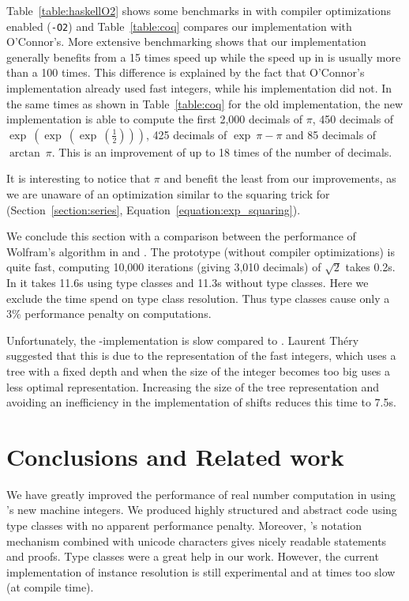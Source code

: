 \documentclass[a4paper,10pt,runningheads]{llncs}
\begin{document}
Table~\ref{table:haskellO2} shows some benchmarks in \Haskell{} with compiler optimizations enabled (\texttt{-O2}) and Table~\ref{table:coq} compares our \Coq{} implementation with O'Connor's. More extensive benchmarking shows that our \Haskell{} implementation generally benefits from a 15 times speed up while the speed up in \Coq{} is usually more than a 100 times. This difference is explained by the fact that O'Connor's \Haskell{} implementation already used fast integers, while his \Coq{} implementation did not. In the same times as shown in Table~\ref{table:coq} for the old implementation, the new implementation is able to compute the first 2,000 decimals of $\pi$, 450 decimals of $\exp\ (\exp\ (\exp\ (\frac 1 2 ))) $, 425 decimals of $\exp\ \pi - \pi$ and 85 decimals of $\arctan\ \pi$. This is an improvement of up to 18 times of the number of decimals.

It is interesting to notice that $\pi$ and \arctan{} benefit the least from our improvements, as we are unaware of an optimization similar to the squaring trick for \exp{} (Section~\ref{section:series}, Equation~\ref{equation:exp_squaring}).

We conclude this section with a comparison between the performance of Wolfram's algorithm in \Coq{} and \Haskell. The \Haskell{} prototype (without compiler optimizations) is quite fast, computing 10,000 iterations (giving 3,010 decimals) of $\sqrt2$ takes 0.2s. In \Coq{} it takes 11.6s using type classes and 11.3s without type classes. Here we exclude the time spend on type class resolution. Thus type classes cause only a 3\% performance penalty on computations.

Unfortunately, the \Coq-implementation is slow compared to \Haskell. Laurent Théry suggested that this is due to the representation of the fast integers, which uses a tree with a fixed depth and when the size of the integer becomes too big uses a less optimal representation. Increasing the size of the tree representation and avoiding an inefficiency in the implementation of shifts reduces this time to 7.5s.

\section{Conclusions and Related work}
We have greatly improved the performance of real number computation in \Coq{} using \Coq's new machine integers. We produced highly structured and abstract code using type classes with no apparent performance penalty. Moreover, \Coq's notation mechanism combined with unicode characters gives nicely readable statements and proofs. Type classes were a great help in our work. However, the current implementation of instance resolution is still experimental and at times too slow (at compile time).
\end{document}
